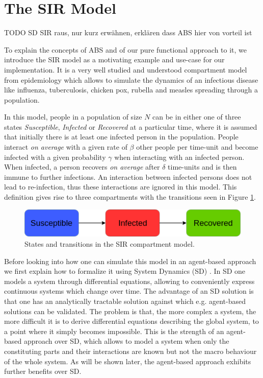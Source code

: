 \section{The SIR Model}
\label{sec:sir_model}
TODO SD SIR raus, nur kurz erwähnen, erklären dass ABS hier von vorteil ist

To explain the concepts of ABS and of our pure functional approach to it, we introduce the SIR model as a motivating example and use-case for our implementation. It is a very well studied and understood compartment model from epidemiology \cite{kermack_contribution_1927} which allows to simulate the dynamics of an infectious disease like influenza, tuberculosis, chicken pox, rubella and measles spreading through a population.

In this model, people in a population of size $N$ can be in either one of three states \textit{Susceptible}, \textit{Infected} or \textit{Recovered} at a particular time, where it is assumed that initially there is at least one infected person in the population. People interact \textit{on average} with a given rate of $\beta$ other people per time-unit and become infected with a given probability $\gamma$ when interacting with an infected person. When infected, a person recovers \textit{on average} after $\delta$ time-units and is then immune to further infections. An interaction between infected persons does not lead to re-infection, thus these interactions are ignored in this model. This definition gives rise to three compartments with the transitions seen in Figure \ref{fig:sir_transitions}.

\begin{figure}
	\centering
	\includegraphics[width=.4\textwidth, angle=0]{./fig/diagrams/SIR_transitions.png}
	\caption{States and transitions in the SIR compartment model.}
	\label{fig:sir_transitions}
\end{figure}

Before looking into how one can simulate this model in an agent-based approach we first explain how to formalize it using System Dynamics (SD) \cite{porter_industrial_1962}. In SD one models a system through differential equations, allowing to conveniently express continuous systems which change over time. The advantage of an SD solution is that one has an analytically tractable solution against which e.g. agent-based solutions can be validated. The problem is that, the more complex a system, the more difficult it is to derive differential equations describing the global system, to a point where it simply becomes impossible. This is the strength of an agent-based approach over SD, which allows to model a system when only the constituting parts and their interactions are known but not the macro behaviour of the whole system. As will be shown later, the agent-based approach exhibits further benefits over SD.

